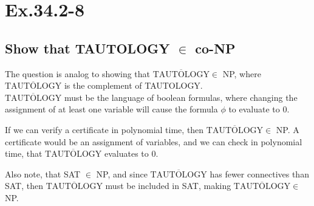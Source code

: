 \section*{Ex.34.2-8}
\subsection*{Show that TAUTOLOGY $\in$ co-NP}

The question is analog to showing that $\overline{\text{TAUTOLOGY}}\in$ NP, where $\overline{\text{TAUTOLOGY}}$ is the complement of TAUTOLOGY.
\\
$\overline{\text{TAUTOLOGY}}$ must be the language of boolean formulas, where changing the assignment of at least one variable will cause the formula $\phi$ to evaluate to 0.

If we can verify a certificate in polynomial time, then $\overline{\text{TAUTOLOGY}}\in$ NP. A certificate would be an assignment of variables, and we can check in polynomial time, that $\overline{\text{TAUTOLOGY}}$ evaluates to 0.

Also note, that SAT $\in$ NP, and since $\overline{\text{TAUTOLOGY}}$ has fewer connectives than SAT, then $\overline{\text{TAUTOLOGY}}$ must be included in SAT, making $\overline{\text{TAUTOLOGY}}\in$ NP.